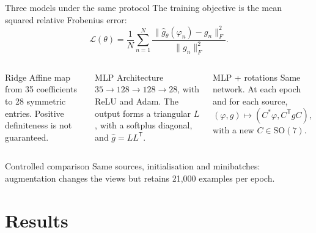 \documentclass[aspectratio=169,11pt]{beamer}
\newcommand{\SO}{\mathrm{SO}}
\begin{document}
\begin{frame}{Three models under the same protocol}
    \small
    The training objective is the mean squared relative Frobenius error:
    \begin{equation*}
        \mathcal L(\theta)=\frac{1}{N}\sum_{n=1}^N
        \frac{\|\widehat g_\theta(\varphi_n)-g_n\|_F^2}{\|g_n\|_F^2}.
    \end{equation*}

    \begin{columns}[T,onlytextwidth]
        \begin{block}{Ridge}
            \scriptsize Affine map from 35 coefficients to 28 symmetric entries.
            Positive definiteness is not guaranteed.
        \end{block}

        \begin{block}{MLP}
            \scriptsize Architecture $35\to128\to128\to28$, with ReLU and Adam.
            The output forms a triangular $L$, with a softplus diagonal, and
            $\widehat g=LL^{\mathsf T}$.
        \end{block}

        \begin{block}{MLP + rotations}
            \scriptsize Same network. At each epoch and for each source,
            \begin{equation*}
                (\varphi,g)\mapsto(C^*\varphi,C^{\mathsf T}gC),
            \end{equation*}
            with a new $C\in\SO(7)$.
        \end{block}
    \end{columns}

    \vspace{-0.18cm}
    \begin{alertblock}{Controlled comparison}
        \footnotesize Same sources, initialisation and minibatches: augmentation changes the views
        but retains 21,000 examples per epoch.
    \end{alertblock}
\end{frame}

\section{Results}
\end{document}
